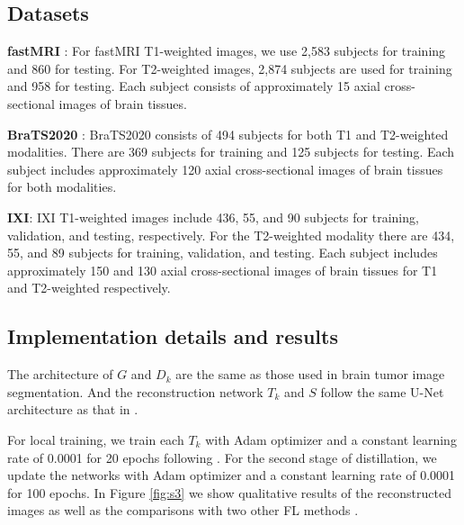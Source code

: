 \documentclass[letterpaper]{article} %
\begin{document}
\subsection{Datasets}
\textbf{fastMRI} \cite{zbontar2018fastMRI}:  For fastMRI T1-weighted images, we use 2,583 subjects for training and 860 for testing. For T2-weighted images, 2,874 subjects are used for training and 958 for testing. Each subject consists of approximately 15 axial cross-sectional images of brain tissues.

\noindent \textbf{BraTS2020} \cite{hdtd-5j88-20}: BraTS2020 consists of 494 subjects for both  T1 and T2-weighted modalities. There are 369 subjects for training and 125 subjects for testing. Each subject includes approximately 120 axial cross-sectional images of brain tissues for both modalities.

\noindent \textbf{IXI}: 
IXI T1-weighted images include 436, 55, and 90 subjects for training, validation, and testing, respectively. 
For the T2-weighted modality there are 434, 55, and 89 subjects for training, validation, and testing.  Each subject includes approximately 150 and 130 axial cross-sectional images of brain tissues for T1 and T2-weighted respectively.

\subsection{Implementation details and results}
The architecture of $G$ and $D_k$ are the same as those used in brain tumor image segmentation. And the reconstruction network $T_k$ and $S$ follow the same U-Net architecture as that in \cite{Guo_2021_CVPR}. 

For local training, we train each $T_k$ with Adam optimizer and a constant learning rate of 0.0001 for 20 epochs following \cite{gong2022federated}. 
For the second stage of distillation, we update the networks with Adam optimizer and a constant learning rate of 0.0001 for 100 epochs. In Figure \ref{fig:s3} we show qualitative results of the reconstructed images as well as the comparisons with two other FL methods  \cite{mcmahan2017communication, Guo_2021_CVPR}.
\end{document}
